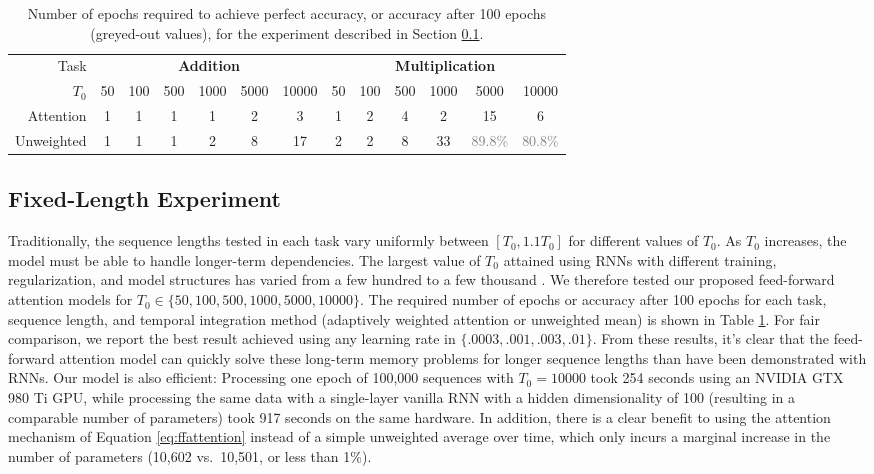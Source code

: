 \documentclass{article} %
\begin{document}
\begin{table}
  \centering
  \footnotesize
  \begin{tabular}{r c c c c c c c c c c c c}
    \toprule
    Task & \multicolumn{6}{c}{\textbf{Addition}} & \multicolumn{6}{c}{\textbf{Multiplication}} \\
    $T_0$ & 50 & 100 & 500 & 1000 & 5000 & 10000 & 50 & 100 & 500 & 1000 & 5000 & 10000 \\
    \cmidrule(r){2-7}
    \cmidrule(r){8-13}
    Attention & 1 & 1 & 1 & 1 & 2 & 3 & 1 & 2 & 4 & 2 & 15 & 6 \\
    Unweighted & 1 & 1 & 1 & 2 & 8 & 17 & 2 & 2 & 8 & 33 & \textcolor{gray}{89.8\%} & \textcolor{gray}{80.8\%} \\
    \bottomrule
  \end{tabular}
  \caption{Number of epochs required to achieve perfect accuracy, or accuracy after 100 epochs (greyed-out values), for the experiment described in Section \ref{sec:fixed}.}
  \label{tab:fixed}
\end{table}

\subsection{Fixed-Length Experiment}
\label{sec:fixed}

Traditionally, the sequence lengths tested in each task vary uniformly between $[T_0, 1.1T_0]$ for different values of $T_0$.
As $T_0$ increases, the model must be able to handle longer-term dependencies.
The largest value of $T_0$ attained using RNNs with different training, regularization, and model structures has varied from a few hundred \cite{martens2011learning,sutskever2013importance,le2015simple,krueger2015regularizing,arjovsky2015unitary} to a few thousand \cite{hochreiter1997long,jaegar2012long}.
We therefore tested our proposed feed-forward attention models for $T_0 \in \{50, 100, 500, 1000, 5000, 10000\}$.
The required number of epochs or accuracy after 100 epochs for each task, sequence length, and temporal integration method (adaptively weighted attention or unweighted mean) is shown in Table \ref{tab:fixed}.
For fair comparison, we report the best result achieved using any learning rate in $\{.0003, .001, .003, .01\}$.
From these results, it's clear that the feed-forward attention model can quickly solve these long-term memory problems for longer sequence lengths than have been demonstrated with RNNs.
Our model is also efficient: Processing one epoch of 100,000 sequences with $T_0 = 10000$ took 254 seconds using an NVIDIA GTX 980 Ti GPU, while processing the same data with a single-layer vanilla RNN with a hidden dimensionality of 100 (resulting in a comparable number of parameters) took 917 seconds on the same hardware.
In addition, there is a clear benefit to using the attention mechanism of Equation \ref{eq:ffattention} instead of a simple unweighted average over time, which only incurs a marginal increase in the number of parameters (10,602 vs.\ 10,501, or less than 1\%).
\end{document}

